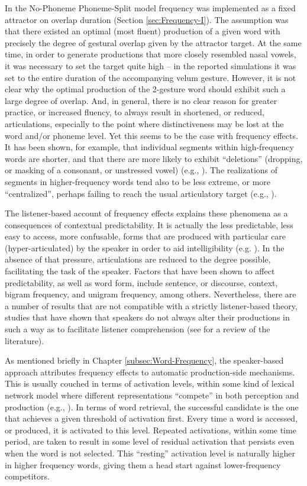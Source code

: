 In the No-Phoneme Phoneme-Split model frequency was implemented as
a fixed attractor on overlap duration (Section \ref{sec:Frequency-I}).
The assumption was that there existed an optimal (most fluent) production
of a given word with precisely the degree of gestural overlap given
by the attractor target. At the same time, in order to generate productions
that more closely resembled nasal vowels, it was necessary to set
the target quite high – in the reported simulations it was set to
the entire duration of the accompanying velum gesture. However, it
is not clear why the optimal production of the 2-gesture word should
exhibit such a large degree of overlap. And, in general, there is
no clear reason for greater practice, or increased fluency, to always
result in shortened, or reduced, articulations, especially to the
point where distinctiveness may be lost at the word and/or phoneme
level. Yet this seems to be the case with frequency effects. It has
been shown, for example, that individual segments within high-frequency
words are shorter, and that there are more likely to exhibit “deletions”
(dropping, or masking of a consonant, or unstressed vowel) (e.g.,
\citealt{Bell2003,Raymond2006,Bybee2008}). The realizations of segments
in higher-frequency words tend also to be less extreme, or more “centralized”,
perhaps failing to reach the usual articulatory target (e.g., \citealt{munson2004effect,Scarborough2004,gahl2008time}).

The listener-based account of frequency effects explains these phenomena
as a consequences of contextual predictability. It is actually the
less predictable, less easy to access, more confusable, forms that
are produced with particular care (hyper-articulated) by the speaker
in order to aid intelligibility (e.g. \citeauthor{Aylett2004}). In
the absence of that pressure, articulations are reduced to the degree
possible, facilitating the task of the speaker. Factors that have
been shown to affect predictability, as well as word form, include
sentence, or discourse, context, bigram frequency, and unigram frequency,
among others. Nevertheless, there are a number of results that are
not compatible with a strictly listener-based theory, studies that
have shown that speakers do not always alter their productions in
such a way as to facilitate listener comprehension (see \citet{turnbull2015assessing}
for a review of the literature).

As mentioned briefly in Chapter \ref{subsec:Word-Frequency}, the
speaker-based approach attributes frequency effects to automatic production-side
mechanisms. This is usually couched in terms of activation levels,
within some kind of lexical network model where different representations
“compete” in both perception and production (e.g., \citealp{mcclelland1981interactive,Dell1986}).
In terms of word retrieval, the successful candidate is the one that
achieves a given threshold of activation first. Every time a word
is accessed, or produced, it is activated to this level. Repeated
activations, within some time period, are taken to result in some
level of residual activation that persists even when the word is not
selected. This “resting” activation level is naturally higher
in higher frequency words, giving them a head start against lower-frequency
competitors. 

